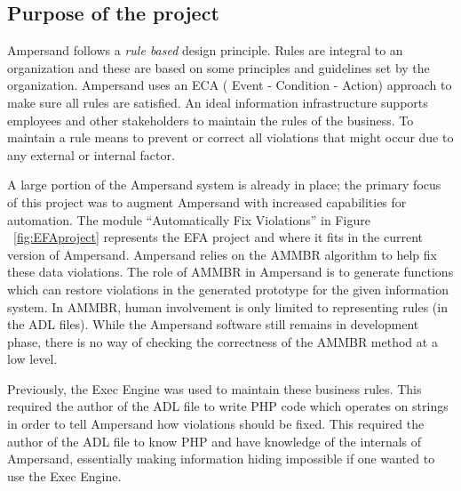 %

\subsection{Purpose of the project}

Ampersand follows a \emph{rule based} design principle. Rules are integral to an organization
and these are based on some principles and guidelines set by the organization.
Ampersand uses an ECA ( Event - Condition - Action) approach to make sure all rules are satisfied. An ideal information infrastructure supports employees and other stakeholders to maintain the rules of the business. To maintain a rule means to prevent or correct all violations that might occur due to any external or internal factor.
 
 A large portion of the Ampersand system is already in place; the primary focus of this project was to
augment Ampersand with increased capabilities for automation. The module ``Automatically Fix Violations'' in Figure ~\ref{fig:EFAproject} represents the EFA project and where it fits in the current version of Ampersand.
Ampersand relies on the AMMBR \citep{Ampersand} algorithm to help fix these data violations. 
The role 
of AMMBR in Ampersand is to generate functions which can restore violations
in the generated prototype for the given information system. In AMMBR, human involvement is only limited 
to representing rules (in the ADL files). While the Ampersand software still 
remains in development phase, there is no way of checking the correctness of 
the AMMBR method at a low level. 

Previously, the Exec Engine was used to 
maintain these business rules. This required the author of the ADL file 
to write PHP code which operates on strings in order to tell Ampersand
how violations should be fixed. This required the author of the 
ADL file to know PHP and have knowledge of the internals of Ampersand,
essentially making information hiding impossible if one wanted to use
the Exec Engine. 
 
